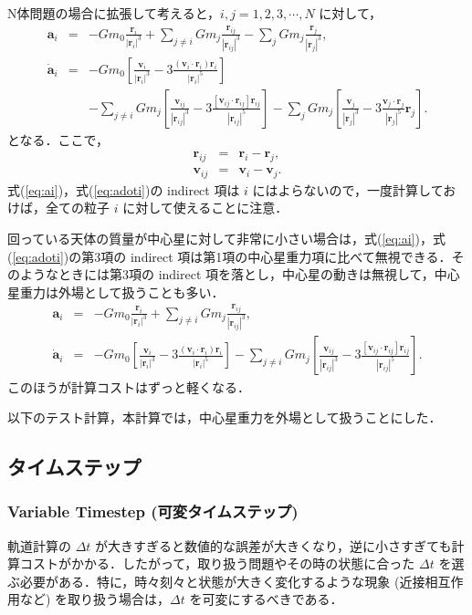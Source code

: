 \documentclass[11pt,a4paper,oneside,onecolumn]{jreport}
\begin{document}
N体問題の場合に拡張して考えると，$i, j = 1, 2, 3, \cdots, N$ に対して，
\begin{eqnarray}
{\bm a}_i & = & - G m_0 \frac{{\bm r}_i}{|{\bm r}_i|^3}  + \sum_{j \not= i} G m_j \frac{{\bm r}_{ij}}{|{\bm r}_{ij} |^3} - \sum_j G m_j \frac{{\bm r}_j}{|{\bm r}_j|^3}, \label{eq:ai} \\
\dot{{\bm a}}_i & = & - G m_0 \left[ \frac{{\bm v}_i}{|{\bm r}_i|^3} - 3 \frac{({\bm v}_i \cdot {\bm r}_i) {\bm r}_i}{|{\bm r}_i|^5} \right] \nonumber \\ 
& & - \sum_{j \not= i} G m_j \left[ \frac{{\bm v}_{ij}}{|{\bm r}_{ij}|^3} - 3 \frac{[{\bm v}_{ij} \cdot {\bm r}_{ij}] {\bm r}_{ij}}{|{\bm r}_{ij}|^5} \right] - \sum_j G m_j \left[ \frac{{\bm v}_j}{|{\bm r}_j|^3} - 3 \frac{{\bm v}_j \cdot {\bm r}_j}{|{\bm r}_j|^5} {\bm r}_j \right]. \label{eq:adoti}
\end{eqnarray}
となる．ここで，
\begin{eqnarray}
{\bm r}_{ij} & = & {\bm r}_{i} - {\bm r}_{j}, \\
{\bm v}_{ij} & = & {\bm v}_{i} - {\bm v}_{j}.
\end{eqnarray}
式(\ref{eq:ai})，式(\ref{eq:adoti})の indirect 項は $i$ にはよらないので，一度計算しておけば，全ての粒子 $i$ に対して使えることに注意．

回っている天体の質量が中心星に対して非常に小さい場合は，式(\ref{eq:ai})，式(\ref{eq:adoti})の第3項の indirect 項は第1項の中心星重力項に比べて無視できる．そのようなときには第3項の indirect 項を落とし，中心星の動きは無視して，中心星重力は外場として扱うことも多い．
\begin{eqnarray}
{\bm a}_i & = & - G m_0 \frac{{\bm r}_i}{|{\bm r}_i|^3}  + \sum_{j \not= i} G m_j \frac{{\bm r}_{ij}}{|{\bm r}_{ij} |^3},  \\
\dot{{\bm a}}_i & = & - G m_0 \left[ \frac{{\bm v}_i}{|{\bm r}_i|^3} - 3 \frac{({\bm v}_i \cdot {\bm r}_i) {\bm r}_i}{|{\bm r}_i|^5} \right] - \sum_{j \not= i} G m_j \left[ \frac{{\bm v}_{ij}}{|{\bm r}_{ij}|^3} - 3 \frac{[{\bm v}_{ij} \cdot {\bm r}_{ij}] {\bm r}_{ij}}{|{\bm r}_{ij}|^5} \right].
\end{eqnarray}
このほうが計算コストはずっと軽くなる．

以下のテスト計算，本計算では，中心星重力を外場として扱うことにした．

\subsection{タイムステップ \label{sec:timestep}}
\subsubsection{Variable Timestep (可変タイムステップ)}
軌道計算の $\Delta t$ が大きすぎると数値的な誤差が大きくなり，逆に小さすぎても計算コストがかかる．したがって，取り扱う問題やその時の状態に合った $\Delta t$ を選ぶ必要がある．特に，時々刻々と状態が大きく変化するような現象 (近接相互作用など) を取り扱う場合は，$\Delta t$ を可変にするべきである．
\end{document}
